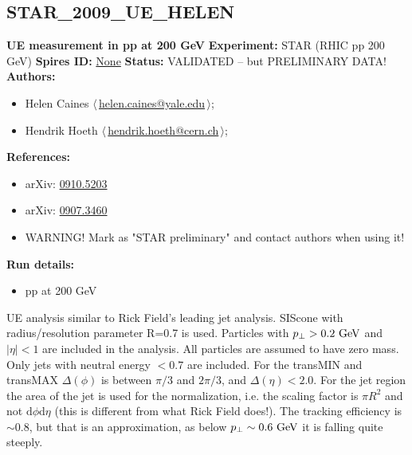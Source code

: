 \subsection{STAR\_2009\_UE\_HELEN}
\textbf{UE measurement in pp at 200 GeV}\newline
\textbf{Experiment:} STAR (RHIC pp 200 GeV) \newline
\textbf{Spires ID:} \href{http://www.slac.stanford.edu/spires/find/hep/www?rawcmd=key+None}{None}\newline
\textbf{Status:} VALIDATED -- but PRELIMINARY DATA!\newline
\textbf{Authors:}
\begin{itemize}
  \item Helen Caines $\langle\,$\href{mailto:helen.caines@yale.edu}{helen.caines@yale.edu}$\,\rangle$;
  \item Hendrik Hoeth $\langle\,$\href{mailto:hendrik.hoeth@cern.ch}{hendrik.hoeth@cern.ch}$\,\rangle$;
\end{itemize}
\textbf{References:}
\begin{itemize}
  \item arXiv: \href{http://arxiv.org/abs/0910.5203}{0910.5203}
  \item arXiv: \href{http://arxiv.org/abs/0907.3460}{0907.3460}
  \item WARNING! Mark as "STAR preliminary" and contact authors when using it!
\end{itemize}
\textbf{Run details:}
\begin{itemize}

  \item pp at 200 GeV\end{itemize}

\noindent UE analysis similar to Rick Field's leading jet analysis. SIScone with radius/resolution parameter R=0.7 is used. Particles with $p_\perp > 0.2~\text{GeV}$ and $|\eta| < 1$ are included in the analysis. All particles are assumed to have zero mass. Only jets with neutral energy $< 0.7$ are included. For the transMIN and transMAX $\Delta(\phi)$ is between $\pi/3$ and $2\pi/3$, and $\Delta(\eta) < 2.0$. For the jet region the area of the jet is used for the normalization, i.e. the scaling factor is $\pi R^2$ and not  $\mathrm{d}\phi\mathrm{d}\eta$ (this is different from what Rick Field does!).  The tracking efficiency is $\sim 0.8$, but that is an approximation,  as below $p_\perp \sim 0.6~\text{GeV}$ it is falling quite steeply.

\clearpage


